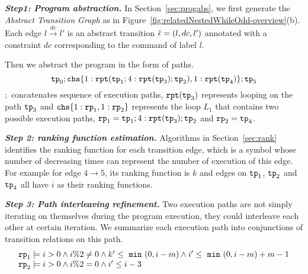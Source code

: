 
\textbf{\emph{Step1: Program abstraction.}}
In Section~\ref{sec:progabs},
we first 
generate the \emph{Abstract Transition Graph} as in Figure~\ref{fig:relatedNestedWhileOdd-overview}(b).
Each edge $l \xrightarrow{dc} l'$ is an abstract transition $\hat{\mathtt{\epsilon}{}} = (l, dc, l')$ annotated with a constraint $dc$ corresponding to the command of label $l$.

Then we abstract the program in the form of paths.
$$
\tpath_0 ; \rpchoose{ 1: \rprepeat(\tpath_1; 4:\rprepeat(\tpath_3); \tpath_2), 1:\rprepeat(\tpath_4) }; \tpath_5
$$
$;$ concatenates sequence of execution paths,
$\mathtt{rpt}(\mathtt{tp}_3)$ represents looping on the path $\mathtt{tp}_3$ and
$\rpchoose{ 1: \rprog_1, 1: \rprog_2 }$ represents the loop $L_1$ that contains two possible execution paths,
$\mathtt{rp}_1 = \mathtt{tp}_1; 4:\mathtt{rpt}(\mathtt{tp}_3);\mathtt{tp}_2$ and $\mathtt{rp}_2 =\mathtt{tp}_4$.

\textbf{\emph{Step 2: ranking function estimation.}}
Algorithms in Section~\ref{sec:rank} identifies the ranking function for each transition edge, which is a symbol whose number of decreasing times can represent the number of execution of this edge.
For example for edge $4 \to 5$, its ranking function is $k$ and edges on $\mathtt{tp}_1$, $\mathtt{tp}_2$ and $\mathtt{tp}_4$ all have $i$ as their ranking functions.


\textbf{\emph{Step 3: Path interleaving refinement.}} 
Two execution paths are not simply iterating on themselves during the program execution,
they could interleave each other at certain iteration.
We summarize each execution path into conjunctions of transition relations on this path.
\begin{equation}
    \begin{array}{l}
        \mathtt{rp}_1 \models i > 0 \land  i \%2 \neq 0 \land k' \leq ~\mathtt{min}~(0, i - m) 
        \land i' \leq ~\mathtt{min}~(0, i - m) + m - 1\\
    \mathtt{rp}_2 \models i > 0 \land i \%2 = 0 \land  i' \leq i - 3
    \end{array}
\end{equation}

